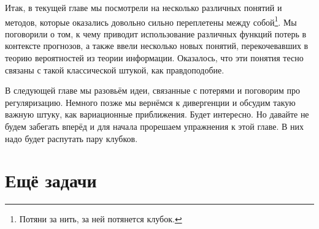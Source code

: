 \documentclass[12pt, a4paper, oneside]{extreport}
\theoremstyle{plain}              %
\theoremstyle{definition}         %
\begin{document}
Итак, в текущей главе мы посмотрели на несколько различных понятий и методов, которые оказались довольно сильно переплетены между собой\footnote{Потяни за нить, за ней потянется клубок.}.  Мы поговорили о том, к чему приводит использование различных функций потерь в контексте прогнозов, а также ввели несколько новых понятий, перекочевавших в теорию вероятностей из теории информации. Оказалось, что эти понятия тесно связаны с такой классической штукой, как правдоподобие. 

В следующей главе мы разовьём идеи, связанные с потерями и поговорим про регуляризацию. Немного позже мы вернёмся к дивергенции и обсудим такую важную штуку, как вариационные приближения. Будет интересно. Но давайте не будем забегать вперёд и для начала прорешаем упражнения к этой главе.  В них надо будет распутать пару клубков. 


\section{Ещё задачи} 
\end{document}
